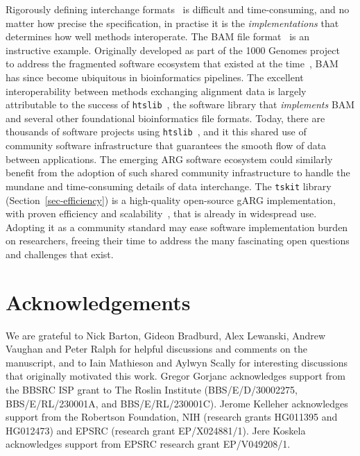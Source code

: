 \documentclass{article}
\begin{document}
Rigorously defining interchange formats~\cite[e.g.][]{kelleher2019htsget}
is difficult and time-consuming,
and no matter how precise the specification, in practise
it is the \emph{implementations} that determines how well methods
interoperate. The BAM file format~\citep{li2009sequence}
is an instructive example. Originally developed as part of the
1000 Genomes project~\citep{10002015global} to address the fragmented
software ecosystem that existed at the time~\citep{danecek2021twelve},
BAM has since become ubiquitous in bioinformatics pipelines.
The excellent interoperability between methods
exchanging alignment data is largely attributable to the
success of \texttt{htslib}~\citep{bonfield2021htslib}, the
software library that \emph{implements} BAM and several other
foundational bioinformatics file formats.
Today, there are thousands of software projects
using \texttt{htslib}~\citep{bonfield2021htslib},
and it this shared use of community software
infrastructure that guarantees the smooth flow of data between
applications.
The emerging ARG software ecosystem could similarly benefit
from the adoption of such shared community infrastructure
to handle the mundane and time-consuming details of data interchange.
The \texttt{tskit} library (Section~\ref{sec-efficiency})
is a high-quality open-source gARG implementation,
with proven efficiency and
scalability~\citep[e.g.][]{anderson2022genes,zhan2023towards},
that is already in widespread use.
Adopting it as a community standard may ease software implementation burden
on researchers, freeing their time to address the many fascinating open
questions and challenges that exist.

\section*{Acknowledgements}
We are grateful to Nick Barton, Gideon Bradburd, Alex Lewanski, Andrew Vaughan
and Peter Ralph for helpful discussions and comments on the manuscript, and
to Iain Mathieson and Aylwyn Scally for interesting discussions that
originally motivated this work.
Gregor Gorjanc acknowledges support from the BBSRC ISP grant to The Roslin Institute
(BBS/E/D/30002275, BBS/E/RL/230001A, and BBS/E/RL/230001C).
Jerome Kelleher acknowledges support from the Robertson Foundation,
NIH (research grants HG011395 and HG012473) and
EPSRC (research grant EP/X024881/1).
Jere Koskela acknowledges support from EPSRC research grant EP/V049208/1.
\end{document}
